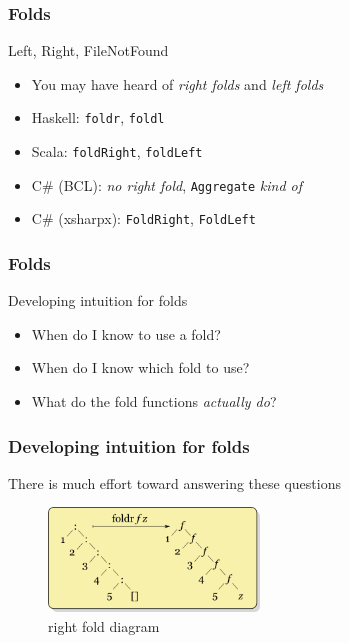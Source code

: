\begin{frame}
\frametitle{Folds}
\begin{block}{Left, Right, FileNotFound}
\begin{itemize}
\item<1-> You may have heard of \emph{right folds} and \emph{left folds}
\item<2-> Haskell: \lstinline{foldr}, \lstinline{foldl}
\item<2-> Scala: \lstinline{foldRight}, \lstinline{foldLeft}
\item<2-> C\# (BCL): \emph{no right fold}, \lstinline{Aggregate} \emph{kind of} 
\item<2-> C\# (xsharpx): \lstinline{FoldRight}, \lstinline{FoldLeft} 
\end{itemize}
\end{block}
\end{frame}

\begin{frame}
\frametitle{Folds}
\begin{block}{Developing intuition for folds}
\begin{itemize}
\item<1-> When do I know to use a fold?
\item<2-> When do I know which fold to use?
\item<3-> What do the fold functions \emph{actually do}?
\end{itemize}
\end{block}
\end{frame}

\begin{frame}
\frametitle{Developing intuition for folds}
\begin{block}{There is much effort toward answering these questions}
\begin{figure}
\centering
\includegraphics[width=0.5\textwidth]{image/Right-fold-transformation.png}
\caption{right fold diagram}
\end{figure}
\end{block}
\end{frame}

